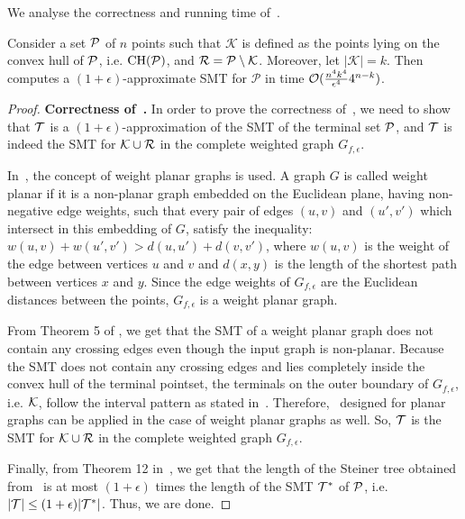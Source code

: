 We analyse the correctness and running time of~.
    \begin{theorem} \label{thm:algo2_correct}
     Consider a set $\mathcal{P}$ of $n$ points such that $\mathcal{K}$ is defined as the points lying on the convex hull of $\mathcal{P}$, i.e. $\mathrm{CH}(\mathcal{P})$, and $\mathcal{R} = \mathcal{P} \setminus \mathcal{K}$. Moreover, let $|\mathcal{K}| = k$. Then~ computes a $(1+\epsilon)$-approximate SMT for $\mathcal{P}$ in time $\mathcal{O}(\frac{n^4k^4}{\epsilon ^4}4^{n-k})$.
    \end{theorem}
    \begin{proof}
{\bf Correctness of~.} 
    In order to prove the correctness of~, we need to show that $\mathcal{T}$ is a $(1+\epsilon)$-approximation of the SMT of the terminal set $\mathcal{P}$, and $\mathcal{T}$ is indeed the SMT for $\mathcal{K} \cup \mathcal{R}$ in the complete weighted graph $G_{f,\epsilon}$.

        In~\cite{scott1988convexity}, the concept of weight planar graphs is used. A graph $G$ is called weight planar if it is a non-planar graph embedded on the Euclidean plane, having non-negative edge weights, such that every pair of edges $(u,v)$ and $(u',v')$ which intersect in this embedding of $G$, satisfy the inequality: $w(u,v) + w(u',v') > d(u,u') + d(v,v')$, where $w(u,v)$ is the weight of the edge between vertices $u$ and $v$ and $d(x,y)$ is the length of the shortest path between vertices $x$ and $y$. Since the edge weights of $G_{f,\epsilon}$ are the Euclidean distances between the points, $G_{f,\epsilon}$ is a weight planar graph. 

        From Theorem 5 of \cite{scott1988convexity}, we get that the SMT of a weight planar graph does not contain any crossing edges even though the input graph is non-planar. Because the SMT does not contain any crossing edges and lies completely inside the convex hull of the terminal pointset, the terminals on the outer boundary of $G_{f,\epsilon}$, i.e. $\mathcal{K}$, follow the interval pattern as stated in~. Therefore,~ designed for planar graphs can be applied in the case of weight planar graphs as well. So, $\mathcal{T}$ is the SMT for $\mathcal{K} \cup \mathcal{R}$ in the complete weighted graph $G_{f,\epsilon}$.

        Finally, from Theorem 12 in~\cite{scott1988convexity}, we get that the length of the Steiner tree obtained from~ is at most $(1+\epsilon)$ times the length of the SMT $\mathcal{T}^*$ of $\mathcal{P}$, i.e. $|\mathcal{T}| \leq (1+\epsilon)|\mathcal{T}^*|$. Thus, we are done.
        

\end{proof}
